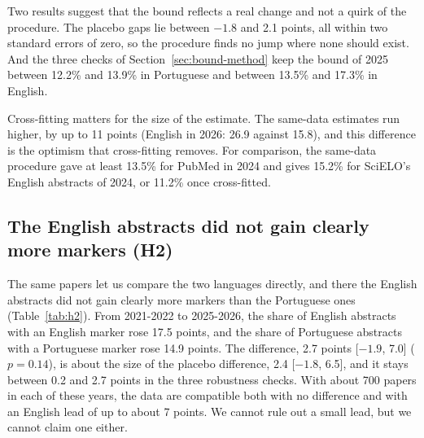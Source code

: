 \documentclass[12pt]{article}
\begin{document}
Two results suggest that the bound reflects a real change and not a quirk of the procedure. The
placebo gaps lie between $-1.8$ and 2.1 points, all within two standard errors of zero, so the
procedure finds no jump where none should exist. And the three checks of
Section~\ref{sec:bound-method} keep the bound of 2025 between 12.2\% and 13.9\% in Portuguese and
between 13.5\% and 17.3\% in English.

Cross-fitting matters for the size of the estimate. The same-data estimates run higher, by up to 11
points (English in 2026: 26.9 against 15.8), and this difference is the optimism that cross-fitting
removes. For comparison, the same-data procedure gave at least 13.5\% for PubMed in 2024
\cite{kobak2025delving} and gives 15.2\% for SciELO's English abstracts of 2024, or 11.2\% once
cross-fitted.

\subsection{The English abstracts did not gain clearly more markers (H2)}
\label{sec:h2}

The same papers let us compare the two languages directly, and there the English abstracts did not
gain clearly more markers than the Portuguese ones (Table~\ref{tab:h2}). From 2021-2022 to
2025-2026, the share of English abstracts with an English marker rose 17.5 points, and the share of
Portuguese abstracts with a Portuguese marker rose 14.9 points. The difference, 2.7 points
[$-1.9$, 7.0] ($p = 0.14$), is about the size of the placebo difference, 2.4 [$-1.8$, 6.5], and it
stays between 0.2 and 2.7 points in the three robustness checks. With about 700 papers in each of
these years, the data are compatible both with no difference and with an English lead of up to
about 7 points. We cannot rule out a small lead, but we cannot claim one either.
\end{document}
